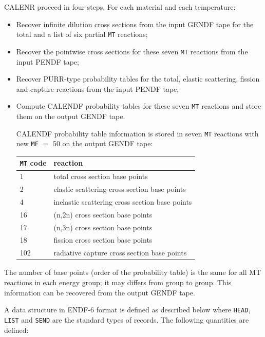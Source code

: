 \vskip 0.2cm

CALENR proceed in four steps. For each material and each temperature:
\begin{itemize}
\item Recover infinite dilution cross sections from the input GENDF tape for
the total and a list of six partial {\tt MT} reactions;
\item Recover the pointwise cross sections for these seven {\tt MT} reactions
from the input PENDF tape;
\item Recover PURR-type probability tables for the total, elastic scattering,
fission and capture reactions from the input PENDF tape;
\item Compute CALENDF probability tables for these seven {\tt MT} reactions and
store them on the output GENDF tape.

CALENDF probability table information is stored in seven {\tt MT} reactions
with new {\tt MF} $=$ 50 on the output GENDF tape:
\vskip 0.1cm
\begin{tabular}{| l | l |}
\hline
{\tt MT} code & reaction \\
\hline
1 & total cross section base points\\
2 & elastic scattering cross section base points\\
4 & inelastic scattering cross section base points\\
16 & (n,2n) cross section base points\\
17 & (n,3n) cross section base points\\
18 & fission cross section base points \\
102 & radiative capture cross section base points \\
\hline
\end{tabular}
\end{itemize}

The number of base points (order of the probability table) is the same for all
MT reactions in each energy group; it may differs from group to group. This
information can be recovered from the output GENDF tape.

A data structure in ENDF-6 format is defined as described below where
{\tt HEAD}, {\tt LIST} and {\tt SEND} are the standard types of
records. The following quantities are defined:

\vskip 0.02cm

